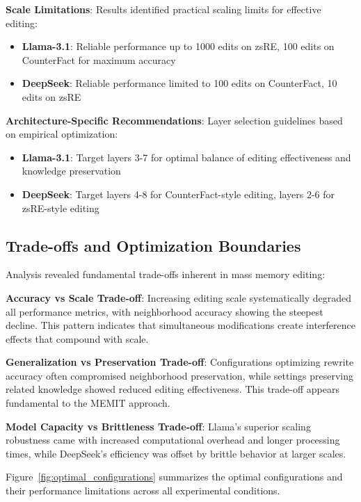 \textbf{Scale Limitations}: Results identified practical scaling limits for effective editing:
\begin{itemize}
    \item \textbf{Llama-3.1}: Reliable performance up to 1000 edits on zsRE, 100 edits on CounterFact for maximum accuracy
    \item \textbf{DeepSeek}: Reliable performance limited to 100 edits on CounterFact, 10 edits on zsRE
\end{itemize}

\textbf{Architecture-Specific Recommendations}: Layer selection guidelines based on empirical optimization:
\begin{itemize}
    \item \textbf{Llama-3.1}: Target layers 3-7 for optimal balance of editing effectiveness and knowledge preservation
    \item \textbf{DeepSeek}: Target layers 4-8 for CounterFact-style editing, layers 2-6 for zsRE-style editing
\end{itemize}

\subsection{Trade-offs and Optimization Boundaries}
\label{subsec:optimization_tradeoffs}

Analysis revealed fundamental trade-offs inherent in mass memory editing:

\textbf{Accuracy vs Scale Trade-off}: Increasing editing scale systematically degraded all performance metrics, with neighborhood accuracy showing the steepest decline. This pattern indicates that simultaneous modifications create interference effects that compound with scale.

\textbf{Generalization vs Preservation Trade-off}: Configurations optimizing rewrite accuracy often compromised neighborhood preservation, while settings preserving related knowledge showed reduced editing effectiveness. This trade-off appears fundamental to the MEMIT approach.

\textbf{Model Capacity vs Brittleness Trade-off}: Llama's superior scaling robustness came with increased computational overhead and longer processing times, while DeepSeek's efficiency was offset by brittle behavior at larger scales.

Figure~\ref{fig:optimal_configurations} summarizes the optimal configurations and their performance limitations across all experimental conditions.

